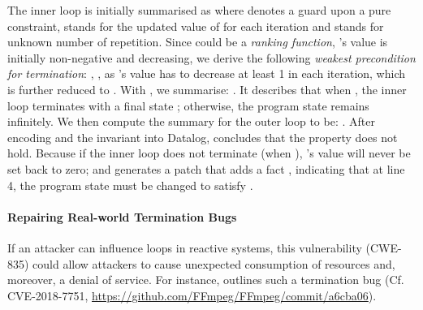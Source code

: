 \documentclass[acmsmall,screen,review,anonymous,nonacm]{acmart}
\begin{document}
The inner loop is initially summarised as 
 where 
\code{[\pi]} denotes a guard upon a pure constraint, 
 stands for the updated value of  for each iteration and \code{\star} stands for unknown number of repetition. 
Since  could be a \emph{ranking function}, \ie  {}'s value is initially non-negative and decreasing,  
we derive the following \emph{weakest precondition for termination}: 
, \ie  
{}, as 's value has to decrease at least 1 in each iteration, which is further reduced to . 
With , we summarise: 
. 
It describes that when , the inner loop terminates with a final state ; otherwise, the program state remains  infinitely. 
We then compute the summary for the outer loop to be: . 
After encoding  and the invariant into Datalog, \toolName concludes that the property does not hold. 
Because if the inner loop does not terminate (when ), 's value will never be set back to zero; and generates a patch that adds a fact  
, indicating that at line 4, the program state must be changed to satisfy . 


\paragraph*{\textbf{Repairing Real-world Termination Bugs}}
\label{sec:example:termination}
If an attacker can influence  loops in reactive systems, this vulnerability (CWE-835) could allow attackers to cause 
unexpected consumption of resources and, moreover, a denial of service. 
For instance,  outlines such a termination bug (Cf. CVE-2018-7751, \url{https://github.com/FFmpeg/FFmpeg/commit/a6cba06}). 
\end{document}
